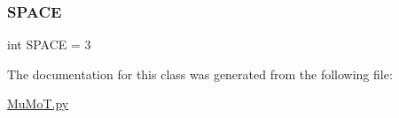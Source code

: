 \mbox{\label{class_mu_mo_t_1_1_network_type_a03813c265f977cc034eb42fd3370bf3d}} 
\subsubsection{\texorpdfstring{S\+P\+A\+CE}{SPACE}}
{\footnotesize\ttfamily int S\+P\+A\+CE = 3\hspace{0.3cm}{\ttfamily [static]}}



The documentation for this class was generated from the following file\+:\begin{DoxyCompactItemize}
\item 
\hyperlink{_mu_mo_t_8py}{Mu\+Mo\+T.\+py}\end{DoxyCompactItemize}
